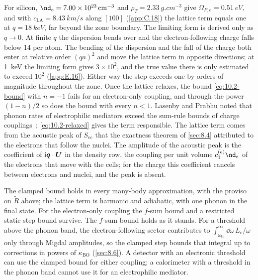 \noindent For silicon, $\nd_e = \SI{7.00e23}{cm^{-3}}$ and $\rho_T = \SI{2.33}{g.cm^{-3}}$ give $\varOmega_{P,e} = \SI{0.51}{eV}$, and with $c_{\mathrm{LA}} = \SI{8.43}{km/s}$ along $[100]$ (\cref{app:C.18}) the lattice term equals one at $q = \SI{18}{keV}$, far beyond the zone boundary. The limiting form is derived only as $q \to 0$. At finite $q$ the dispersion bends over and the electron-following charge falls below 14 per atom. The bending of the dispersion and the fall of the charge both enter at relative order $(qa)^2$ and move the lattice term in opposite directions; at \SI{1}{keV} the limiting form gives $3\times10^2$, and the true value there is only estimated to exceed $10^2$ (\cref{app:E.16}). Either way the step exceeds one by orders of magnitude throughout the zone. Once the lattice relaxes, the bound \cref{eq:10.2-bound} with $n = -1$ fails for an electron-only coupling, and through the power $(1 - n)/2$ so does the bound with every $n < 1$. Lasenby and Prabhu noted that phonon rates of electrophilic mediators exceed the sum-rule bounds of charge couplings~\cite[Sect.~VII]{lasenby2022dark}; \cref{eq:10.2-relaxed} gives the term responsible. The lattice term comes from the acoustic peak of $S_{ee}$ that the exactness theorem of \cref{sec:8.4} attributed to the electrons that follow the nuclei. The amplitude of the acoustic peak is the coefficient of $\mathrm{i}\bm{q}\cdot\bm{U}$ in the density row, the coupling per unit volume $c_1^{(e)}\nd_e$ of the electrons that move with the cells; for the charge this coefficient cancels between electrons and nuclei, and the peak is absent.

The clamped bound holds in every many-body approximation, with the proviso on $\tilde R$ above; the lattice term is harmonic and adiabatic, with one phonon in the final state. For the electron-only coupling the $f$-sum bound and a restricted static-step bound survive. The $f$-sum bound holds as it stands. For a threshold above the phonon band, the electron-following sector contributes to $\int_{\omega_{\mathrm{th}}}^\infty\dd\omega\,L_e/\omega$ only through Migdal amplitudes, so the clamped step bounds that integral up to corrections in powers of $\kappa_{\mathrm{BO}}$ (\cref{sec:8.6}). A detector with an electronic threshold can use the clamped bound for either coupling; a calorimeter with a threshold in the phonon band cannot use it for an electrophilic mediator.

